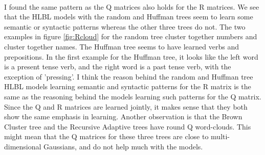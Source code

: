 \paragraph{}
I found the same pattern as the Q matrices also holds for the R matrices. We see that the HLBL models with the random and Huffman trees seem to learn some semantic or syntactic patterns whereas the other three trees do not. The two examples in figure \ref{fig:Rcloud} for the random tree cluster together numbers and cluster together names. The Huffman tree seems to have learned verbs and prepositions. In the first example for the Huffman tree, it looks like the left word is a present tense verb, and the right word is a past tense verb, with the exception of 'pressing'. I think the reason behind the random and Huffman tree HLBL models learning semantic and syntactic patterns for the R matrix is the same as the reasoning behind the models learning such patterns for the Q matrix. Since the Q and R matrices are learned jointly, it makes sense that they both show the same emphasis in learning. Another observation is that the Brown Cluster tree and the Recursive Adaptive trees have round Q word-clouds. This might mean that the Q matrices for these three trees are close to multi-dimensional Gaussians, and do not help much with the models.


